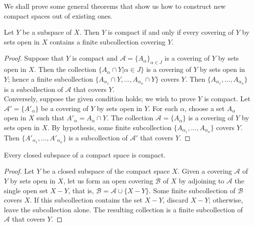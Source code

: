 \documentclass[a4paper,english,12pt]{article}
\begin{document}
We shall prove some general theorems that show us how to construct new
compact spaces out of existing ones.

\begin{lem}
	Let $Y$ be a subspace of $X$. Then $Y$ is compact if and only if every covering of $Y$ by sets open in $X$ contains a finite subcollection covering $Y$.
\end{lem}
\begin{proof}
	Suppose that $Y$ is compact and $\mathcal{A} = \{A_\alpha\}_{\alpha \in J}$ is a covering of $Y$ by sets open in $X$. Then the collection
	$\{A_\alpha \cap Y | \alpha \in J \}$
	is a covering of $Y$ by sets open in $Y$; hence a finite subcollection
	$ \{A_{\alpha_1} \cap Y, ... , A_{\alpha_n} \cap Y \}$ 
	covers $Y$. Then $\{A_{\alpha_1}, ...,A_{\alpha_n}\}$ is a subcollection of $\mathcal{A}$ that covers $Y$. \\
	
	Conversely, suppose the given condition holds; we wish to prove $Y$ is compact. Let $\mathcal{A}' = \{A'_\alpha \}$ be a covering of $Y$ by sets open in $Y$. For each $\alpha$, choose a set $A_\alpha$ open in $X$ such that $A'_\alpha = A_\alpha \cap Y$. The collection $\mathcal{A} = \{A_\alpha\}$ is a covering of $Y$ by sets open in $X$. By hypothesis, some finite subcollection $\{A_{\alpha_1},..., A_{\alpha_n}\}$ covers $Y$. Then $\{A'_{\alpha_1},..., A'_{\alpha_n}\}$ is a subcollection
of $\mathcal{A}'$ that covers $Y$.
\end{proof}

\begin{thm}\label{thm26.2}
	Every closed subspace of a compact space is compact.
\end{thm}
\begin{proof}
	Let $Y$ be a closed subspace of the compact space $X$. Given a covering $\mathcal{A}$ of $Y$ by sets open in $X$, let us form an open covering $\mathcal{B}$ of $X$ by adjoining to $\mathcal{A}$ the single open set $X - Y$, that is, $\mathcal{B} = \mathcal{A} \cup \{X - Y\}$.
	Some finite subcollection of $\mathcal{B}$ covers $X$. If this subcollection contains the set $X - Y$, discard $X - Y$; otherwise, leave the subcollection alone. The resulting collection is a finite subcollection of $\mathcal{A}$ that covers $Y$.
\end{proof}
\end{document}
